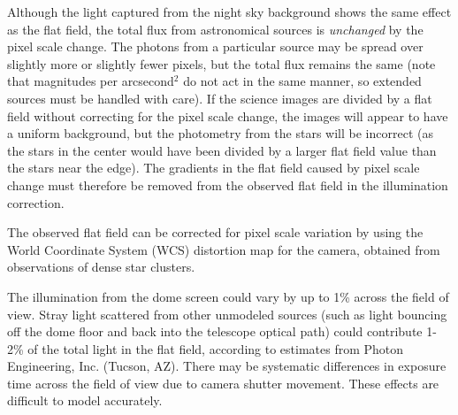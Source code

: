\documentclass[12pt,preprint]{aastex}
\begin{document}
Although the light captured from the night sky background shows the
same effect as the flat field, the total flux from astronomical
sources is {\it unchanged} by the pixel scale change.  The photons
from a particular source may be spread over slightly more or slightly
fewer pixels, but the total flux remains the same (note that
magnitudes per arcsecond$^{2}$ do not act in the same manner, so
extended sources must be handled with care). If the science images are
divided by a flat field without correcting for the pixel scale change,
the images will appear to have a uniform background, but the
photometry from the stars will be incorrect (as the stars in the
center would have been divided by a larger flat field value than the
stars near the edge). The gradients in the flat field caused by pixel
scale change must therefore be removed from the observed flat field in
the illumination correction.

The observed flat field can be corrected for pixel scale variation by
using the World Coordinate System (WCS) distortion map for the camera,
obtained from observations of dense star clusters. 

\label{sec:stray/scattered}

The illumination from the dome screen could vary by up to 1\% across
the field of view. Stray light scattered from other unmodeled sources
(such as light bouncing off the dome floor and back into the telescope
optical path) could contribute 1-2\% of the total light in the flat
field, according to estimates from Photon Engineering, Inc. (Tucson,
AZ).  There may be systematic differences in exposure time across the
field of view due to camera shutter movement. These effects are
difficult to model accurately. 
\end{document}
